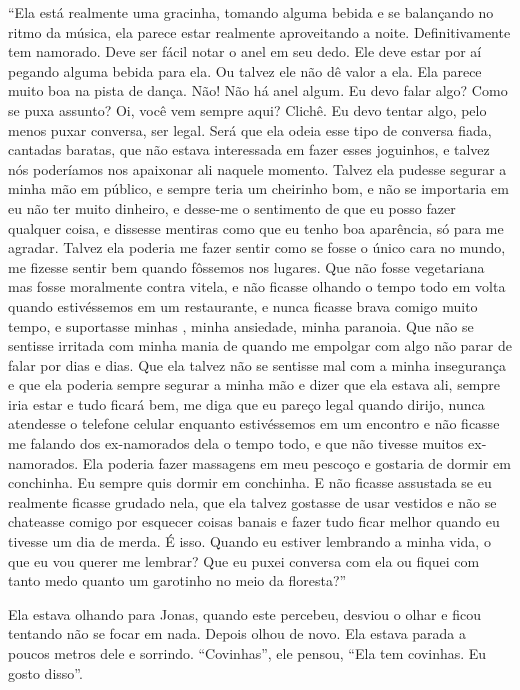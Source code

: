 ``Ela está realmente uma gracinha, tomando alguma bebida e se balançando no ritmo da música, ela parece estar realmente aproveitando a noite. Definitivamente tem namorado. Deve ser fácil notar o anel em seu dedo. Ele deve estar por aí pegando alguma bebida para ela. Ou talvez ele não dê valor a ela. Ela parece muito boa na pista de dança. Não! Não há anel algum. Eu devo falar algo? Como se puxa assunto? Oi, você vem sempre aqui? Clichê. Eu devo tentar algo, pelo menos puxar conversa, ser legal. Será que ela odeia esse tipo de conversa fiada, cantadas baratas, que não estava interessada em fazer esses joguinhos, e talvez nós poderíamos nos apaixonar ali naquele momento. Talvez ela pudesse segurar a minha mão em público, e sempre teria um cheirinho bom, e não se importaria  em eu não ter muito dinheiro, e desse-me o sentimento de que eu posso fazer qualquer coisa, e dissesse mentiras como que eu tenho boa aparência, só para me agradar. Talvez ela poderia me fazer sentir como se fosse o único cara no mundo, me fizesse sentir bem quando fôssemos nos lugares. Que não fosse vegetariana\mudanca{,} mas fosse moralmente contra vitela, e não ficasse olhando o tempo todo em volta quando estivéssemos em um restaurante, e nunca ficasse brava comigo muito tempo, e suportasse minhas , minha ansiedade, minha paranoia. Que não se sentisse irritada com minha mania de quando me empolgar com algo não parar de falar  por dias e dias. Que ela talvez não se sentisse mal com a minha insegurança e que ela poderia sempre segurar a minha mão e dizer que ela estava ali, sempre iria estar e tudo ficará bem, me diga que eu pareço legal quando dirijo, nunca atendesse o telefone celular enquanto estivéssemos em um encontro e não ficasse me falando dos ex-namorados dela o tempo todo, e que não tivesse muitos ex-namorados. Ela poderia fazer massagens em meu pescoço e gostaria de dormir em conchinha. Eu sempre quis dormir em conchinha. E não ficasse assustada se eu realmente ficasse grudado nela, que ela talvez gostasse de usar vestidos e não se chateasse comigo por esquecer coisas banais e fazer tudo ficar melhor quando eu tivesse um dia de merda. É isso. Quando eu estiver lembrando a minha vida, o que eu vou querer me lembrar? Que eu puxei conversa com ela ou fiquei com tanto medo quanto um garotinho no meio da floresta?''

Ela estava olhando para Jonas, quando este percebeu, desviou o olhar e ficou tentando não se focar em nada. Depois olhou de novo. Ela estava parada a poucos metros dele e sorrindo. ``Covinhas'', ele pensou, ``Ela tem covinhas. Eu gosto disso''.


